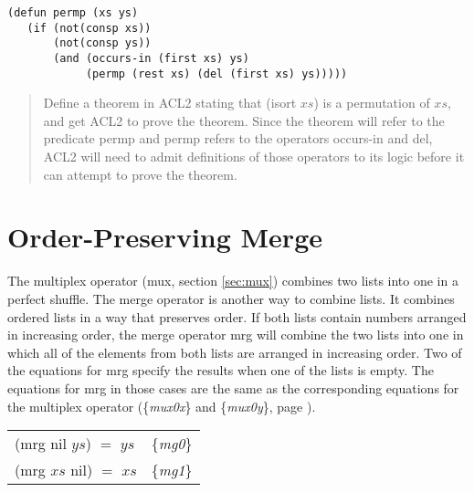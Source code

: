 \begin{exercises}
\label{defun:permp}
\begin{code}
\begin{verbatim}
(defun permp (xs ys)
   (if (not(consp xs))
       (not(consp ys))
       (and (occurs-in (first xs) ys)
            (permp (rest xs) (del (first xs) ys)))))
\end{verbatim}
\end{code}
\begin{quote}
Define a theorem in ACL2 stating that \textsf{(isort $xs$)} is a
permutation of $xs$, and
get ACL2 to prove the theorem.
Since the theorem will refer to the predicate \textsf{permp}
and \textsf{permp} refers to the operators \textsf{occurs-in} and \textsf{del},
ACL2 will need to admit definitions of those operators
to its logic before it can attempt to prove the theorem.
\end{quote}

\end{exercises}

\section{Order-Preserving Merge}
\label{sec:mrg}

The multiplex operator (\textsf{mux}, section \ref{sec:mux})
combines two lists into one in a perfect shuffle.
The merge operator is another way to combine lists.
It combines ordered lists
in a way that preserves order.
If both lists contain numbers arranged in increasing order,
the merge operator \textsf{mrg}
will combine the two lists
into one in which all of the elements from both lists
are arranged in increasing order.
Two of the equations for \textsf{mrg}
specify the results when one of the lists is empty.
The equations for \textsf{mrg} in those cases are the same as
the corresponding equations for the multiplex operator
(\{\emph{mux0x}\} and \{\emph{mux0y}\}, page \pageref{def:mux}).

\begin{center}
\begin{tabular}{ll}
\textsf{(mrg nil $ys$) $=$ $ys$} & \{\emph{mg0}\} \\
\textsf{(mrg $xs$ nil) $=$ $xs$} & \{\emph{mg1}\} \\
\end{tabular}
\end{center}

